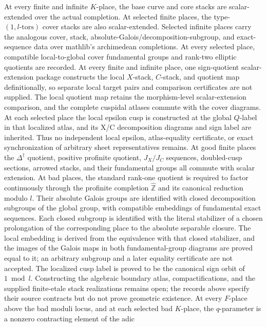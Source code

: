 \documentclass[11pt]{article}
\theoremstyle{plain}
\theoremstyle{definition}
\theoremstyle{remark}
\begin{document}
At every finite and infinite \(K\)-place, the base curve and core stacks are
scalar-extended over the actual completion.  At selected finite places, the
type-\((1,l\text{-tors})\) cover stacks are also scalar-extended.  Selected
infinite places carry the analogous cover,
stack, absolute-Galois/decomposition-subgroup, and exact-sequence data over
mathlib's archimedean completions.  At every selected place, compatible
local-to-global cover fundamental groups and rank-two elliptic quotients are
recorded.  At every finite and infinite place, one sign-quotient
scalar-extension package constructs the local \(X\)-stack, \(C\)-stack, and
quotient map definitionally, so separate local target pairs and comparison
certificates are not supplied.  The local quotient map retains the
morphism-level scalar-extension comparison, and the complete cuspidal atlases commute with
the cover diagrams.  At each selected place the local epsilon cusp is
constructed at the global \(Q\)-label in that localized atlas, and its X/C
decomposition diagrams and sign label are inherited.  Thus no independent
local epsilon, atlas-equality certificate, or exact synchronization of
arbitrary sheet representatives remains.  At good finite places the
\(\Delta^\dagger\) quotient,
positive profinite quotient, \(J_X/J_C\) sequences, doubled-cusp sections,
arrowed stacks, and their fundamental groups all commute with scalar
extension.  At bad
places, the standard rank-one quotient is
required to factor continuously through the profinite completion
\(\widehat{\mathbb Z}\) and its canonical reduction modulo \(l\).  Their
absolute Galois groups are identified with closed decomposition subgroups of
the global group, with compatible embeddings of fundamental exact sequences.
Each closed subgroup is identified with the literal stabilizer of a chosen
prolongation of the corresponding place to the absolute separable closure.
The local embedding is derived from the equivalence with that closed
stabilizer, and the images of the Galois maps in both fundamental-group
diagrams are proved equal to it; an arbitrary subgroup and a later equality
certificate are not accepted.
The localized cusp label is proved to be the canonical sign orbit of
\(1\bmod l\).  Constructing the algebraic boundary atlas, compactifications,
and the supplied finite-etale stack realizations remains open; the records
above specify their source contracts but do not prove geometric existence.
At every \(F\)-place above the bad moduli locus, and at each selected bad
\(K\)-place, the \(q\)-parameter is a nonzero contracting element of the adic
\end{document}

